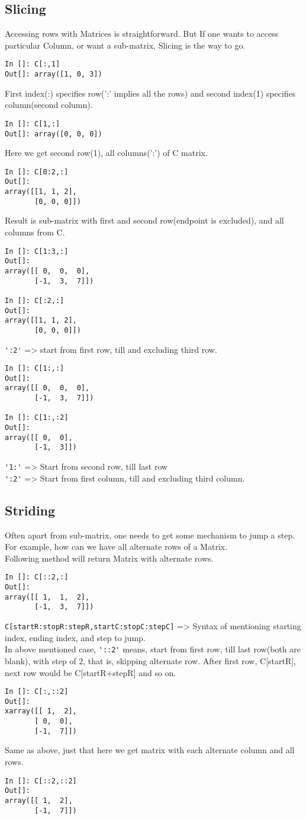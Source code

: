 \documentclass[12pt]{article}
\newcommand{\typ}[1]{\lstinline{#1}}
\begin{document}
\subsection{Slicing}
Accessing rows with Matrices is straightforward. But If one wants to access particular Column, or want a sub-matrix, Slicing is the way to go.
\begin{lstlisting}
In []: C[:,1]
Out[]: array([1, 0, 3])
\end{lstlisting}
First index(:) specifies row(':' implies all the rows) and second index(1) specifies column(second column).
\begin{lstlisting}
In []: C[1,:]
Out[]: array([0, 0, 0])
\end{lstlisting}
Here we get second row(1), all columns(':') of C matrix.
\newpage
\begin{lstlisting}
In []: C[0:2,:]
Out[]: 
array([[1, 1, 2],
       [0, 0, 0]])
\end{lstlisting}
Result is sub-matrix with first and second row(endpoint is excluded), and all columns from C.
\begin{lstlisting}
In []: C[1:3,:]
Out[]: 
array([[ 0,  0,  0],
       [-1,  3,  7]])

In []: C[:2,:]
Out[]: 
array([[1, 1, 2],
       [0, 0, 0]])
\end{lstlisting}
\typ{':2'} => start from first row, till and excluding third row.
\begin{lstlisting}
In []: C[1:,:]
Out[]: 
array([[ 0,  0,  0],
       [-1,  3,  7]])

In []: C[1:,:2]
Out[]: 
array([[ 0,  0],
       [-1,  3]])
\end{lstlisting}
\typ{'1:'} => Start from second row, till last row\\
\typ{':2'} => Start from first column, till and excluding third column.
\newpage
\subsection{Striding}
Often apart from sub-matrix, one needs to get some mechanism to jump a step. For example, how can we have all alternate rows of a Matrix. \\
Following method will return Matrix with alternate rows.
\begin{lstlisting}
In []: C[::2,:]
Out[]: 
array([[ 1,  1,  2],
       [-1,  3,  7]])
\end{lstlisting}
\typ{C[startR:stopR:stepR,startC:stopC:stepC]} => Syntax of mentioning starting index, ending index, and step to jump.\\
In above mentioned case, \typ{'::2'} means, start from first row, till last row(both are blank), with step of 2, that is, skipping alternate row. After first row, C[startR], next row would be C[startR+stepR] and so on.
\begin{lstlisting}
In []: C[:,::2]
Out[]: 
xarray([[ 1,  2],
       [ 0,  0],
       [-1,  7]])
\end{lstlisting}
Same as above, just that here we get matrix with each alternate column and all rows.
\begin{lstlisting}
In []: C[::2,::2]
Out[]: 
array([[ 1,  2],
       [-1,  7]])
\end{lstlisting}
\end{document}
